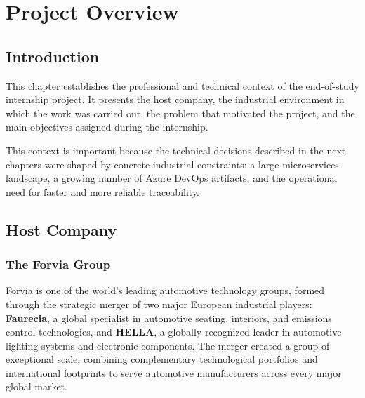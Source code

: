 
\chapter{Project Overview}
\label{chap:project-overview}

\section{Introduction}
\label{sec:overview-intro}

This chapter establishes the professional and technical context of the
end-of-study internship project. It presents the host company, the industrial
environment in which the work was carried out, the problem that motivated the
project, and the main objectives assigned during the internship.

This context is important because the technical decisions described in the next
chapters were shaped by concrete industrial constraints: a large microservices
landscape, a growing number of Azure DevOps artifacts, and the operational need
for faster and more reliable traceability.

\section{Host Company}
\label{sec:host-company}

\subsection{The Forvia Group}
\label{subsec:forvia-group}

Forvia is one of the world's leading automotive technology groups, formed
through the strategic merger of two major European industrial players:
\textbf{Faurecia}, a global specialist in automotive seating, interiors, and
emissions control technologies, and \textbf{HELLA}, a globally recognized
leader in automotive lighting systems and electronic components. The merger
created a group of exceptional scale, combining complementary technological
portfolios and international footprints to serve automotive manufacturers
across every major global market.

